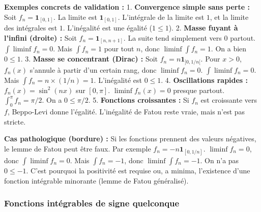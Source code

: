 \documentclass[11pt,a4paper]{article}
\begin{document}
\textbf{Exemples concrets de validation :}
1. \textbf{Convergence simple sans perte :} Soit $f_n = \mathbf{1}_{[0, 1]}$. La limite est $\mathbf{1}_{[0, 1]}$. L'intégrale de la limite est $1$, et la limite des intégrales est $1$. L'inégalité est une égalité ($1 \le 1$).
2. \textbf{Masse fuyant à l'infini (droite) :} Soit $f_n = \mathbf{1}_{[n, n+1]}$. La suite tend simplement vers $0$ partout. $\int \liminf f_n = 0$. Mais $\int f_n = 1$ pour tout $n$, donc $\liminf \int f_n = 1$. On a bien $0 \le 1$.
3. \textbf{Masse se concentrant (Dirac) :} Soit $f_n = n \mathbf{1}_{]0, 1/n[}$. Pour $x > 0$, $f_n(x)$ s'annule à partir d'un certain rang, donc $\liminf f_n = 0$. $\int \liminf f_n = 0$. Mais $\int f_n = n \times (1/n) = 1$. L'inégalité est $0 \le 1$.
4. \textbf{Oscillations rapides :} $f_n(x) = \sin^2(nx)$ sur $[0, \pi]$. $\liminf f_n(x) = 0$ presque partout. $\int_0^\pi f_n = \pi/2$. On a $0 \le \pi/2$.
5. \textbf{Fonctions croissantes :} Si $f_n$ est croissante vers $f$, Beppo-Levi donne l'égalité. L'inégalité de Fatou reste vraie, mais n'est pas stricte.

\textbf{Cas pathologique (bordure) :}
Si les fonctions prennent des valeurs négatives, le lemme de Fatou peut être faux. Par exemple $f_n = -n \mathbf{1}_{[0, 1/n]}$. $\liminf f_n = 0$, donc $\int \liminf f_n = 0$. Mais $\int f_n = -1$, donc $\liminf \int f_n = -1$. On n'a pas $0 \le -1$. C'est pourquoi la positivité est requise ou, a minima, l'existence d'une fonction intégrable minorante (lemme de Fatou généralisé).

\subsubsection{Fonctions intégrables de signe quelconque}

\begin{center}
\end{center}
\end{document}
